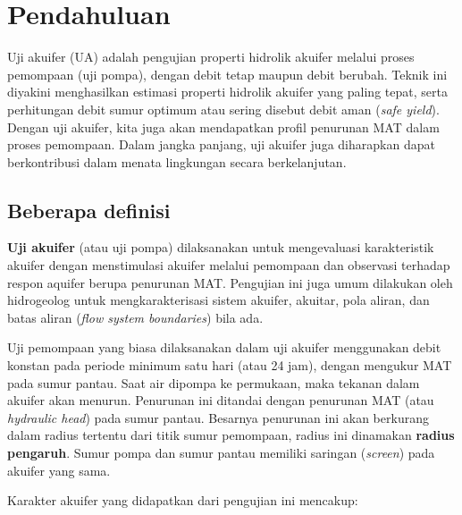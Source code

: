 \section{Pendahuluan}

Uji akuifer (UA) adalah pengujian properti hidrolik akuifer melalui proses pemompaan (uji pompa), dengan debit tetap maupun debit berubah. Teknik ini diyakini menghasilkan estimasi properti hidrolik akuifer yang paling tepat, serta perhitungan debit sumur optimum atau sering disebut debit aman (\textit{safe yield}). Dengan uji akuifer, kita juga akan mendapatkan profil penurunan MAT dalam proses pemompaan. Dalam jangka panjang, uji akuifer juga diharapkan dapat berkontribusi dalam menata lingkungan secara berkelanjutan. 


\subsection{Beberapa definisi}

\textbf{Uji akuifer} (atau uji pompa) dilaksanakan untuk mengevaluasi karakteristik akuifer dengan menstimulasi akuifer melalui pemompaan dan observasi terhadap respon aquifer berupa penurunan MAT. Pengujian ini juga umum dilakukan oleh hidrogeolog untuk mengkarakterisasi sistem akuifer, akuitar, pola aliran, dan batas aliran (\textit{flow system boundaries}) bila ada. 

Uji pemompaan yang biasa dilaksanakan dalam uji akuifer menggunakan debit konstan pada periode minimum satu hari (atau 24 jam), dengan mengukur MAT pada sumur pantau. Saat air dipompa ke permukaan, maka tekanan dalam akuifer akan menurun. Penurunan ini ditandai dengan penurunan MAT (atau \textit{hydraulic head}) pada sumur pantau. Besarnya penurunan ini akan berkurang dalam radius tertentu dari titik sumur pemompaan, radius ini dinamakan \textbf{radius pengaruh}. Sumur pompa dan sumur pantau memiliki saringan (\textit{screen}) pada akuifer yang sama. 

Karakter akuifer yang didapatkan dari pengujian ini mencakup: 

